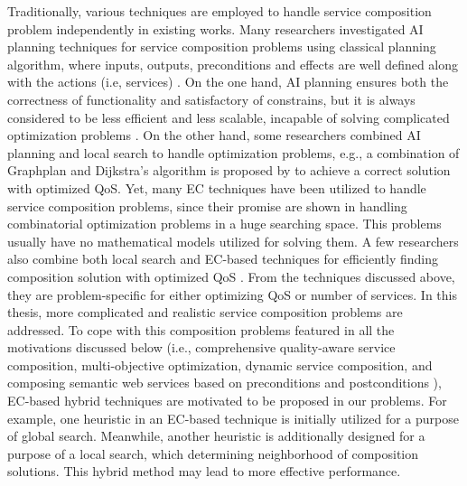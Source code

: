 Traditionally, various techniques are employed to handle service composition problem independently in existing works. Many researchers investigated AI planning techniques for service composition problems using classical planning algorithm, where inputs, outputs, preconditions and effects are well defined along with the actions (i.e, services) \cite{markou2015non,peer2005web}. On the one hand, AI planning ensures both the correctness of functionality and satisfactory of constrains, but it is always considered to be less efficient and less scalable, incapable of solving complicated optimization problems \cite{parejo2008qos}. On the other hand, some researchers combined AI planning and local search to handle optimization problems, e.g., a combination of Graphplan \cite{blum1997fast} and Dijkstra’s algorithm is proposed by \cite{feng2013dynamic} to achieve a correct solution with optimized QoS. Yet, many EC techniques have been utilized to handle service composition problems, since their promise are shown in handling combinatorial optimization problems in a huge searching space. This problems usually have no mathematical models utilized for solving them. A few researchers also combine both local search and EC-based techniques for efficiently finding composition solution with optimized QoS \cite{parejo2008qos}. From the techniques discussed above, they are problem-specific for either optimizing QoS or number of services. In this thesis, more complicated and realistic service composition problems are addressed. To cope with this composition problems featured in all the motivations discussed below (i.e., comprehensive quality-aware service composition, multi-objective optimization, dynamic service composition, and composing semantic web services based on preconditions and postconditions ), EC-based hybrid techniques are motivated to be proposed in our problems. For example, one heuristic in an EC-based technique is initially utilized for a purpose of global search. Meanwhile, another heuristic is additionally designed for a purpose of a local search, which determining neighborhood of composition solutions. This hybrid method may lead to more effective performance.

